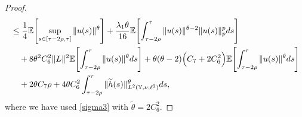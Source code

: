 \documentclass[11pt]{article}
\numberwithin{equation}{section}
\theoremstyle{plain}
\begin{document}
\begin{proof}
\begin{align}
	&\le 
	        \frac{1}{4}
	             \mathbb{E}
	                    \Biggl[ \sup_{s \in [\tau - 2\rho,\tau]}
  	                                     \|u(s)\|^{\theta}
	                    \Biggr]
	       + \frac{\lambda_1 \theta}{16 }
	                \mathbb{E}
	                       \Biggl[ \int_{\tau - 2\rho}^{\tau}
	                                       \|u(s)\|^{\theta-2}
	                                       \|u(s)\|_{p}^{p} ds
	                       \Biggr]  
	                       \nonumber \\
	&\quad  
	   + 8\theta^2 C_6^2 \|L\|^2 
	        \mathbb{E}
	             \Biggl[ \int_{\tau - 2\rho}^{\tau}
                             	\|u(s)\|^{\theta} ds
	            \Biggr]
	   + \theta(\theta-2)
	           \Bigl( C_7 + 2 C_6^2
	           \Bigr)
	           \mathbb{E}
	                 \Biggl[ \int_{\tau - 2\rho}^{\tau}
	                                 \|u(s)\|^{\theta} ds
	                \Biggr]   
	                \nonumber \\
	&\quad  
	   + 2 \theta C_7 \rho
	   + 4 \theta C_6^2
	         \int_{\tau - 2\rho}^{\tau}
	             \| \widetilde{h}(s) \|^{\theta}_{L^2(\mathbb{Y}, \nu; \ell^2) } 
	             ds,   
\end{align}
where we have used
 \eqref{sigma3}
 with  $\tilde{\theta} = 2C_6^2$.


\end{proof}
\end{document}
